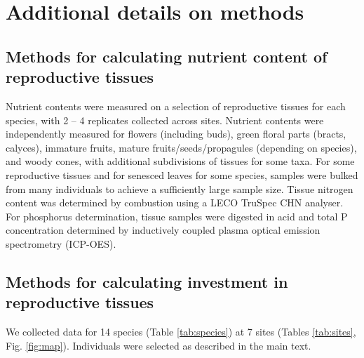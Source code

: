 \documentclass[10pt,twoside]{article}\usepackage[]{graphicx}\usepackage[]{color}
\begin{document}
\clearpage


\section{Additional details on methods}

\subsection{Methods for calculating nutrient content of reproductive tissues}

Nutrient contents were measured on a selection of reproductive tissues for each species, with 2 – 4 replicates collected across sites. Nutrient contents were independently measured for flowers (including buds), green floral parts (bracts, calyces), immature fruits, mature fruits/seeds/propagules (depending on species), and woody cones, with additional subdivisions of tissues for some taxa.  For some reproductive tissues and for senesced leaves for some species, samples were bulked from many individuals to achieve a sufficiently large sample size. Tissue nitrogen content was determined by combustion using a LECO TruSpec CHN analyser. For phosphorus determination, tissue samples were digested in acid and total P concentration determined by inductively coupled plasma optical emission spectrometry (ICP-OES).  

\subsection{Methods for calculating investment in reproductive tissues}

We collected data for 14 species (Table \ref{tab:species}) at 7 sites (Tables \ref{tab:sites}, Fig. \ref{fig:map}). Individuals were selected as described in the main text.
\end{document}
